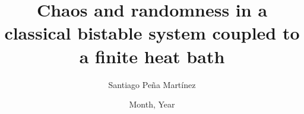 
\title{Chaos and randomness in a classical bistable
system coupled to a finite heat bath}

\author{Santiago Peña Martínez}





\date{Month, Year}

